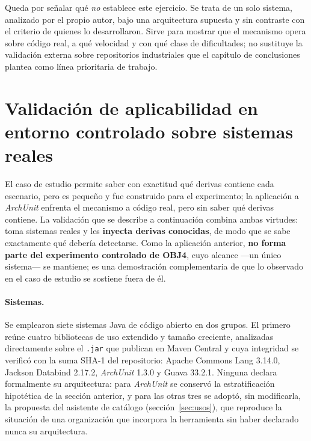 Queda por señalar qué \emph{no} establece este ejercicio. Se trata de un solo sistema, analizado por el propio autor, bajo una arquitectura supuesta y sin contraste con el criterio de quienes lo desarrollaron. Sirve para mostrar que el mecanismo opera sobre código real, a qué velocidad y con qué clase de dificultades; no sustituye la validación externa sobre repositorios industriales que el capítulo de conclusiones plantea como línea prioritaria de trabajo.

\section{Validación de aplicabilidad en entorno controlado sobre sistemas reales}
\label{sec:sistemas}
El caso de estudio permite saber con exactitud qué derivas contiene cada escenario, pero es pequeño y fue construido para el experimento; la aplicación a \textit{ArchUnit} enfrenta el mecanismo a código real, pero sin saber qué derivas contiene. La validación que se describe a continuación combina ambas virtudes: toma sistemas reales y les \textbf{inyecta derivas conocidas}, de modo que se sabe exactamente qué debería detectarse. Como la aplicación anterior, \textbf{no forma parte del experimento controlado de OBJ4}, cuyo alcance ---un único sistema--- se mantiene; es una demostración complementaria de que lo observado en el caso de estudio se sostiene fuera de él.

\paragraph{Sistemas.} Se emplearon siete sistemas Java de código abierto en dos grupos. El primero reúne cuatro bibliotecas de uso extendido y tamaño creciente, analizadas directamente sobre el \texttt{.jar} que publican en Maven Central y cuya integridad se verificó con la suma SHA-1 del repositorio: Apache Commons Lang 3.14.0, Jackson Databind 2.17.2, \textit{ArchUnit} 1.3.0 y Guava 33.2.1. Ninguna declara formalmente su arquitectura: para \textit{ArchUnit} se conservó la estratificación hipotética de la sección anterior, y para las otras tres se adoptó, sin modificarla, la propuesta del asistente de catálogo (sección~\ref{sec:usos}), que reproduce la situación de una organización que incorpora la herramienta sin haber declarado nunca su arquitectura.

